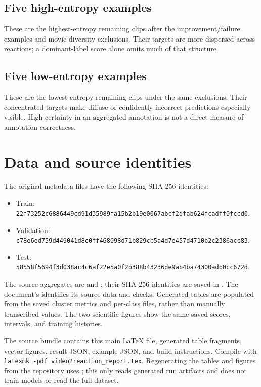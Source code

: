 \documentclass[11pt,a4paper]{article}
\newcommand{\code}[1]{\texttt{#1}}
\begin{document}
\subsection{Five high-entropy examples}
These are the highest-entropy remaining clips after the improvement/failure examples and movie-diversity exclusions. Their targets are more dispersed across reactions; a dominant-label score alone omits much of that structure.

\clearpage
\subsection{Five low-entropy examples}
These are the lowest-entropy remaining clips under the same exclusions. Their concentrated targets make diffuse or confidently incorrect predictions especially visible. High certainty in an aggregated annotation is not a direct measure of annotation correctness.


\clearpage
\section{Data and source identities}
The original metadata files have the following SHA-256 identities:
\begin{itemize}
\item Train: \nolinkurl{22f73252c6886449cd91d35989fa15b2b19e0067abcf2dfab624fcadff0fccd0}.
\item Validation: \nolinkurl{c78e6ed759d449041d8c0ff468098d71b829cb5a4d7e457d4710b2c2386acc83}.
\item Test: \nolinkurl{58558f5694f3d038ac4c6af22e5a0f2b388b43236de9ab4ba74300adb0cc672d}.
\end{itemize}
The source aggregates are  and ; their SHA-256 identities are saved in .
The document's  identifies its source data and checks. Generated tables are populated from the saved cluster metrics and per-class files, rather than manually transcribed values. The two scientific figures show the same saved scores, intervals, and training histories.

The source bundle contains this main \LaTeX{} file, generated table fragments, vector figures, result JSON, example JSON, and build instructions. Compile with \code{latexmk -pdf video2reaction\_report.tex}. Regenerating the tables and figures from the repository uses ; this only reads generated run artifacts and does not train models or read the full dataset.
\end{document}
